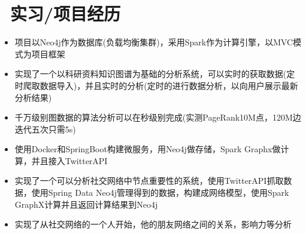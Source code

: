 \documentclass{resume}
\begin{document}
\section{\faUsers\ 实习/项目经历}
\vspace{-0.7em}
\begin{onehalfspacing}
\begin{itemize}
  \item 项目以Neo4j作为数据库(负载均衡集群)，采用Spark作为计算引擎，以MVC模式为项目框架
  \item 实现了一个以科研资料知识图谱为基础的分析系统，可以实时的获取数据(定时爬取数据导入)，并且实时的分析(定时的进行数据分析，以向用户展示最新分析结果)
  \item 千万级别图数据的算法分析可以在秒级别完成(实测PageRank10M点，120M边迭代五次只需5s)
\end{itemize}
\end{onehalfspacing}
\vspace{-0.7em}
\begin{onehalfspacing}
\begin{itemize}
  \item 使用Docker和SpringBoot构建微服务，用Neo4j做存储，Spark Graphx做计算，并且接入TwitterAPI
  \item 实现了一个可以分析社交网络中节点重要性的系统，使用TwitterAPI抓取数据，使用Spring Data Neo4j管理得到的数据，构建成网络模型，使用Spark GraphX计算并且返回计算结果到Neo4j
  \item 实现了从社交网络的一个人开始，他的朋友网络之间的关系，影响力等分析
\end{itemize}
\end{onehalfspacing}

\end{document}
